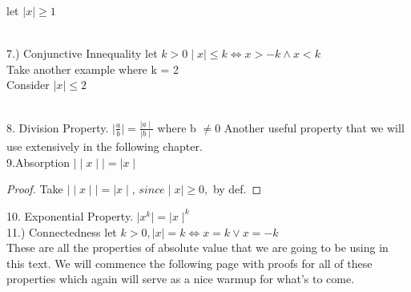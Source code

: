 \documentclass[12pt]{article}
\theoremstyle{definition}
\newenvironment{statement}[2][Section]{\begin{trivlist}
\item[\hskip \labelsep {\bfseries #1}\hskip \labelsep {\bfseries #2.}]}{\end{trivlist}}
\begin{document}
\begin{statement}{Absolute Value and Why it's so useful}
let $\mid x \mid \ge 1$



\\




7.) Conjunctive Innequality
let $k > 0 \mid x \mid \le k \iff x > -k \land x < k $\\
Take another example where k = 2\\
Consider $\mid x \mid \le 2$\\

\\








8. Division Property.
$\mid \frac{a}{b} \mid = \frac{\mid a \mid}{\mid b \mid} $ where b $\ne 0$
Another useful property that we will use extensively in the following chapter.\\

9.Absorption
$\mid \mid x \mid \mid = \mid x \mid$\\
\begin{proof}
Take $\mid \mid x \mid \mid = \mid x \mid$, $since \mid x \mid \ge 0,$ by def.
\end{proof}

10. Exponential Property.
$\mid x^k \mid = \mid x \mid^{k} $\\



11.) Connectedness
let $k > 0, \mid x \mid = k \iff x = k \vee x = -k$\\


These are all the properties of absolute value that we are going to be using in this text. We will commence the following page with proofs for all of these properties which again will serve as a nice warmup for what's to come.



\end{statement}
\end{document}
